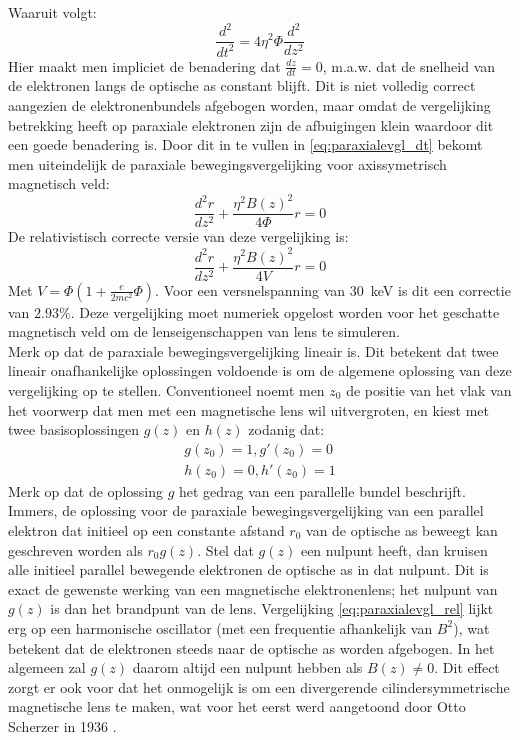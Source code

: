 \documentclass[we,twoside,openright,a4paper,11pt]{uantwerpenbamathesis}
\begin{document}
Waaruit volgt:
\begin{equation}
    \frac{d^2}{dt^2}=4\eta^2\Phi\frac{d^2}{dz^2}
\end{equation}
Hier maakt men impliciet de benadering dat $\frac{dz}{dt}=0$, m.a.w. dat de snelheid van de elektronen langs de optische as constant blijft. Dit is niet volledig correct aangezien de elektronenbundels afgebogen worden, maar omdat de vergelijking betrekking heeft op paraxiale elektronen zijn de afbuigingen klein waardoor dit een goede benadering is. Door dit in te vullen in \ref{eq:paraxialevgl_dt} bekomt men uiteindelijk de paraxiale bewegingsvergelijking voor axissymetrisch magnetisch veld:
\begin{equation}\label{eq:paraxialevgl}
    \frac{d^2r}{dz^2}+\frac{\eta^2B(z)^2}{4\Phi}r=0
\end{equation}
De relativistisch correcte versie van deze vergelijking is:
\begin{equation}\label{eq:paraxialevgl_rel}
    \frac{d^2r}{dz^2}+\frac{\eta^2B(z)^2}{4V}r=0
\end{equation}
Met $V=\Phi\left(1+\frac{e}{2mc^2}\Phi\right)$. Voor een versnelspanning van $30$~keV is dit een correctie van $2.93\%$. Deze vergelijking moet numeriek opgelost worden voor het geschatte magnetisch veld om de lenseigenschappen van lens te simuleren. \\

Merk op dat de paraxiale bewegingsvergelijking lineair is. Dit betekent dat twee lineair onafhankelijke oplossingen voldoende is om de algemene oplossing van deze vergelijking op te stellen. Conventioneel noemt men $z_0$ de positie van het vlak van het voorwerp dat men met een magnetische lens wil uitvergroten, en kiest met twee basisoplossingen $g(z)$ en $h(z)$ zodanig dat:
\begin{align}\label{eq:BVW}
    g(z_0)=1, g'(z_0)=0 \\[6pt]
    h(z_0)=0, h'(z_0)=1
\end{align}
Merk op dat de oplossing $g$ het gedrag van een parallelle bundel beschrijft. Immers, de oplossing voor de paraxiale bewegingsvergelijking van een parallel elektron dat initieel op een constante afstand $r_0$ van de optische as beweegt kan geschreven worden als $r_0g(z)$. Stel dat $g(z)$ een nulpunt heeft, dan kruisen alle initieel parallel bewegende elektronen de optische as in dat nulpunt. Dit is exact de gewenste werking van een magnetische elektronenlens; het nulpunt van $g(z)$ is dan het brandpunt van de lens. Vergelijking \ref{eq:paraxialevgl_rel} lijkt erg op een harmonische oscillator (met een frequentie afhankelijk van $B^2$), wat betekent dat de elektronen steeds naar de optische as worden afgebogen. In het algemeen zal $g(z)$ daarom altijd een nulpunt hebben als $B(z)\neq0$. Dit effect zorgt er ook voor dat het onmogelijk is om een divergerende cilindersymmetrische magnetische lens te maken, wat voor het eerst werd aangetoond door Otto Scherzer in 1936 \cite{scherzer1936}.
\end{document}
